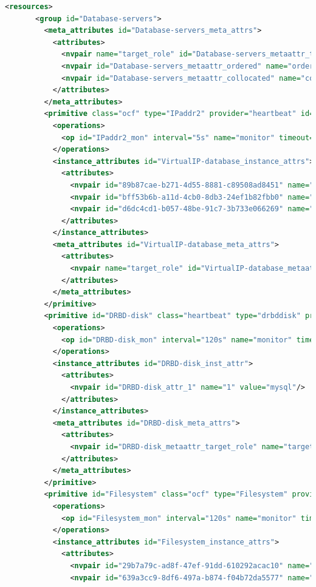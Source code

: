 \documentclass[a4paper,10pt]{report}
\begin{document}
\begin{lstlisting}[language=xml]
     <resources>
       <group id="Database-servers">
         <meta_attributes id="Database-servers_meta_attrs">
           <attributes>
             <nvpair name="target_role" id="Database-servers_metaattr_target_role" value="started"/>
             <nvpair id="Database-servers_metaattr_ordered" name="ordered" value="true"/>
             <nvpair id="Database-servers_metaattr_collocated" name="collocated" value="true"/>
           </attributes>
         </meta_attributes>
         <primitive class="ocf" type="IPaddr2" provider="heartbeat" id="VirtualIP-database">
           <operations>
             <op id="IPaddr2_mon" interval="5s" name="monitor" timeout="5s"/>
           </operations>
           <instance_attributes id="VirtualIP-database_instance_attrs">
             <attributes>
               <nvpair id="89b87cae-b271-4d55-8881-c89508ad8451" name="ip" value="172.16.16.221"/>
               <nvpair id="bff53b6b-a11d-4cb0-8db3-24ef1b82fbb0" name="nic" value="eth1"/>
               <nvpair id="d6dc4cd1-b057-48be-91c7-3b733e066269" name="cidr_netmask" value="24"/>
             </attributes>
           </instance_attributes>
           <meta_attributes id="VirtualIP-database_meta_attrs">
             <attributes>
               <nvpair name="target_role" id="VirtualIP-database_metaattr_target_role" value="started"/>
             </attributes>
           </meta_attributes>
         </primitive>
         <primitive id="DRBD-disk" class="heartbeat" type="drbddisk" provider="heartbeat">
           <operations>
             <op id="DRBD-disk_mon" interval="120s" name="monitor" timeout="60s"/>
           </operations>
           <instance_attributes id="DRBD-disk_inst_attr">
             <attributes>
               <nvpair id="DRBD-disk_attr_1" name="1" value="mysql"/>
             </attributes>
           </instance_attributes>
           <meta_attributes id="DRBD-disk_meta_attrs">
             <attributes>
               <nvpair id="DRBD-disk_metaattr_target_role" name="target_role" value="started"/>
             </attributes>
           </meta_attributes>
         </primitive>
         <primitive id="Filesystem" class="ocf" type="Filesystem" provider="heartbeat">
           <operations>
             <op id="Filesystem_mon" interval="120s" name="monitor" timeout="60s"/>
           </operations>
           <instance_attributes id="Filesystem_instance_attrs">
             <attributes>
               <nvpair id="29b7a79c-ad8f-47ef-91dd-610292acac10" name="device" value="/dev/drbd0"/>
               <nvpair id="639a3cc9-8df6-497a-b874-f04b72da5577" name="directory" value="/mnt/drbddata"/>

\end{lstlisting}
\end{document}
